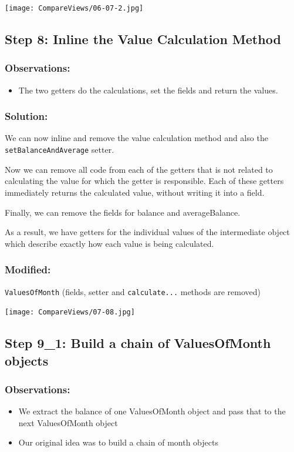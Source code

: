 \documentclass[a4paper,fleqn,titlepage,11pt]{article}
\begin{document}
\texttt{[image: CompareViews/06-07-2.jpg]}



\subsection*{Step 8: Inline the Value Calculation Method}

\subsubsection*{Observations:}
\begin{itemize}
\item The two getters do the calculations, set the fields and return the values. 
\end{itemize}

\subsubsection*{Solution:}

We can now inline and remove the value calculation method and also the \texttt{setBalanceAndAverage} setter.

Now we can remove all code from each of the getters that is not related to calculating the value for which the getter is responsible. Each of these getters immediately returns the calculated value, without writing it into a field.

Finally, we can remove the fields for balance and averageBalance.

As a result, we have getters for the individual values of the intermediate object which describe exactly how each value is being calculated.

\subsubsection*{Modified:}

\texttt{ValuesOfMonth} (fields, setter and \texttt{calculate...} methods are removed)

\texttt{[image: CompareViews/07-08.jpg]}

\subsection*{Step 9\_1: Build a chain of ValuesOfMonth objects}

\subsubsection*{Observations:}
\begin{itemize}
\item  We extract the balance of one ValuesOfMonth object and pass that to the next ValuesOfMonth object
\item Our original idea was to build a chain of month objects
\end{itemize}
\end{document}
